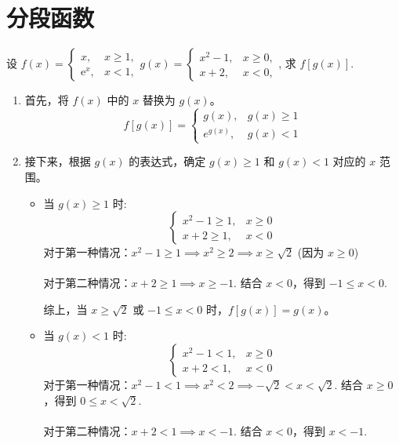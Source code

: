 \section{分段函数}

\begin{example}
    设 $f(x)=\left\{\begin{array}{ll}x, & x \geq 1, \\ \mathrm{e}^x, & x<1,\end{array} g(x)=\left\{\begin{array}{ll}x^2-1, & x \geq 0, \\ x+2, & x<0,\end{array}\right.\right.$, 求 $f[g(x)]$.
\end{example}

\begin{solution}
    \begin{enumerate}
        \item 首先，将 $f(x)$ 中的 $x$ 替换为 $g(x)$。
              $$ f[g(x)] = \begin{cases}
                      g(x),     & g(x) \ge 1 \\
                      e^{g(x)}, & g(x) < 1
                  \end{cases} $$

        \item 接下来，根据 $g(x)$ 的表达式，确定 $g(x) \ge 1$ 和 $g(x) < 1$ 对应的 $x$ 范围。

              \begin{itemize}
                  \item 当 $g(x) \ge 1$ 时:
                        $$
                            \begin{cases}
                                x^2-1 \ge 1, & x \ge 0 \\
                                x+2 \ge 1,   & x < 0
                            \end{cases}
                        $$
                        对于第一种情况：$x^2-1 \ge 1 \implies x^2 \ge 2 \implies x \ge \sqrt{2}$ (因为 $x \ge 0$)\\\\
                        对于第二种情况：$x+2 \ge 1 \implies x \ge -1$. 结合 $x < 0$，得到 $-1 \le x < 0$.

                        综上，当 $x \ge \sqrt{2}$ 或 $-1 \le x < 0$ 时，$f[g(x)]=g(x)$。

                  \item 当 $g(x) < 1$ 时:
                        $$
                            \begin{cases}
                                x^2-1 < 1, & x \ge 0 \\
                                x+2 < 1,   & x < 0
                            \end{cases}
                        $$
                        对于第一种情况：$x^2-1 < 1 \implies x^2 < 2 \implies -\sqrt{2} < x < \sqrt{2}$. 结合 $x \ge 0$，得到 $0 \le x < \sqrt{2}$.\\\\
                        对于第二种情况：$x+2 < 1 \implies x < -1$. 结合 $x < 0$，得到 $x < -1$.


\end{itemize}
\end{enumerate}
\end{solution}
